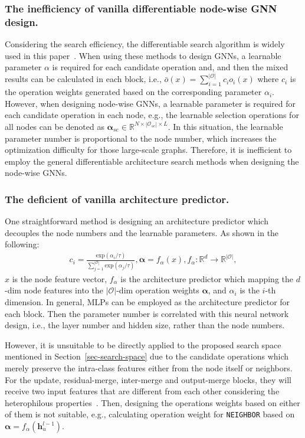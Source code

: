 \documentclass[sigconf]{acmart}
\def\bh{\textbf{h}}
\def\bal{\bm{\alpha}}
\begin{document}
\subsubsection{The inefficiency of vanilla differentiable node-wise GNN design.}
Considering the search efficiency, the differentiable search algorithm is widely used in this paper~\cite{xie2018snas,liu2018darts}. When using these methods to design GNNs, a learnable parameter $\alpha$ is required for each candidate operation and, and then the mixed results can be calculated in each block, i.e.,  $\bar{o}(x) = \sum_{i=1}^{|\mathcal{O}|}c_io_i(x)$ where $c_i$ is the operation weights generated based on the corresponding parameter $\alpha_i$. 
However, when designing node-wise GNNs, a learnable parameter is required for each candidate operation in each node, 
e.g., the learnable selection operations for all nodes can be denoted as $\bal_{se} \in \mathbb{R}^{N \times |\mathcal{O}_{se}|  \times L}$. 
In this situation, the learnable parameter number is proportional to the node number, which increases the optimization difficulty for those large-scale graphs. Therefore, it is inefficient to employ the general differentiable architecture search methods when designing the node-wise GNNs.





\subsubsection{The deficient of vanilla architecture predictor.}
One straightforward method is designing an architecture predictor which decouples the node numbers and the learnable parameters. As shown in the following:
\begin{align}
	\label{eq-vanilla-predictor}
 c_i = \frac{\text{exp}(\alpha_i / \tau)}{\sum_{j=1}^{|\mathcal{O}|} \text{exp}(\alpha_j / \tau)},
	\bm{\alpha} = f_{\alpha}(x), f_{\alpha}: \mathbb{R}^{d} \rightarrow \mathbb{R}^{|\mathcal{O}|},
\end{align}
$x$ is the node feature vector, $f_{\alpha}$ is the architecture predictor which mapping the $d$-dim node features into the $|\mathcal{O}|$-dim operation weights $\bm{\alpha}$, and $\alpha_i$ is the $i$-th dimension. In general, MLPs can be employed as the architecture predictor for each block. Then the parameter number is correlated with this neural network design, i.e., the layer number and hidden size,  rather than the node numbers.


However, it is unsuitable to be directly applied to the proposed search space mentioned in Section~\ref{sec-search-space} due to the candidate operations which merely preserve the intra-class features either from the node itself or neighbors.
For the update, residual-merge, inter-merge and output-merge blocks, they will receive two input features that are different from each other considering the heterophilous properties~\cite{zhu2020beyond}.
Then, designing the operations weights based on either of them is not suitable, e.g., calculating operation weight for \texttt{NEIGHBOR} based on  $\bal = f_{\alpha}(\bh_u^{l-1})$.
\end{document}
